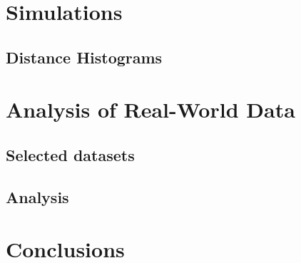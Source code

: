 \documentclass[11pt,oneside]{report}
\theoremstyle{definition}
\begin{document}
\chapter{Simulations}



\section{Distance Histograms}



\chapter{Analysis of Real-World Data}

\section{Selected datasets}

\section{Analysis}


\chapter{Conclusions}



\end{document}
